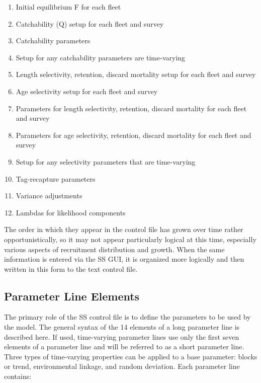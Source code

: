 \begin{enumerate}
		\item Initial equilibrium F for each fleet
		\\
		\item Catchability (Q) setup for each fleet and survey
		\item Catchability parameters
		\item Setup for any catchability parameters are time-varying
		\\
		\item Length selectivity, retention, discard mortality setup for each fleet and survey
		\item Age selectivity setup for each fleet and survey
		\item Parameters for length selectivity, retention, discard mortality for each fleet and survey
		\item Parameters for age selectivity, retention, discard mortality for each fleet and survey
		\item Setup for any selectivity parameters that are time-varying
		\\
		\item Tag-recapture parameters
		\\
		\item Variance adjustments
		\item Lambdas for likelihood components
	\end{enumerate}
The order in which they appear in the control file has grown over time rather opportunistically, so it may not appear particularly logical at this time, especially various aspects of recruitment distribution and growth.  When the same information is entered via the SS GUI, it is organized more logically and then written in this form to the text control file.

\subsection{Parameter Line Elements}
The primary role of the SS control file is to define the parameters to be used by the model.  The general syntax of the 14 elements of a long parameter line is described here.  If used, time-varying parameter lines use only the first seven elements of a parameter line and will be referred to as a short parameter line.  Three types of time-varying properties can be applied to a base parameter:  blocks or trend, environmental linkage, and random deviation.  Each parameter line contains:

